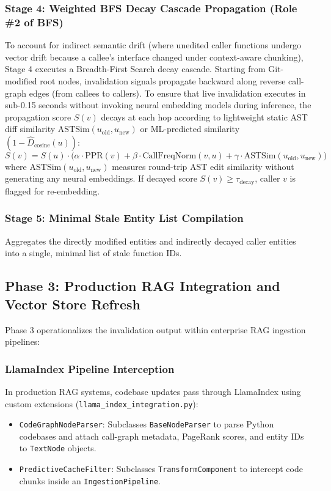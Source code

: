 \documentclass[conference]{IEEEtran}
\begin{document}
\subsubsection{Stage 4: Weighted BFS Decay Cascade Propagation (Role \#2 of BFS)}
To account for indirect semantic drift (where unedited caller functions undergo vector drift because a callee's interface changed under context-aware chunking), Stage 4 executes a Breadth-First Search decay cascade. Starting from Git-modified root nodes, invalidation signals propagate backward along reverse call-graph edges (from callees to callers). To ensure that live invalidation executes in sub-0.15 seconds without invoking neural embedding models during inference, the propagation score $S(v)$ decays at each hop according to lightweight static AST diff similarity $\text{ASTSim}(u_{\text{old}}, u_{\text{new}})$ or ML-predicted similarity $(1 - \hat{D}_{\text{cosine}}(u))$:
\begin{equation}
S(v) = S(u) \cdot \Big( \alpha \cdot \text{PPR}(v) + \beta \cdot \text{CallFreqNorm}(v, u) + \gamma \cdot \text{ASTSim}(u_{\text{old}}, u_{\text{new}}) \Big)
\end{equation}
where $\text{ASTSim}(u_{\text{old}}, u_{\text{new}})$ measures round-trip AST edit similarity without generating any neural embeddings. If decayed score $S(v) \ge \tau_{\text{decay}}$, caller $v$ is flagged for re-embedding.

\subsubsection{Stage 5: Minimal Stale Entity List Compilation}
Aggregates the directly modified entities and indirectly decayed caller entities into a single, minimal list of stale function IDs.

\subsection{Phase 3: Production RAG Integration and Vector Store Refresh}
Phase 3 operationalizes the invalidation output within enterprise RAG ingestion pipelines:

\subsubsection{LlamaIndex Pipeline Interception}
In production RAG systems, codebase updates pass through LlamaIndex using custom extensions (\texttt{llama\_index\_integration.py}):
\begin{itemize}
    \item \texttt{CodeGraphNodeParser}: Subclasses \texttt{BaseNodeParser} to parse Python codebases and attach call-graph metadata, PageRank scores, and entity IDs to \texttt{TextNode} objects.
    \item \texttt{PredictiveCacheFilter}: Subclasses \texttt{TransformComponent} to intercept code chunks inside an \texttt{IngestionPipeline}.
\end{itemize}
\end{document}
